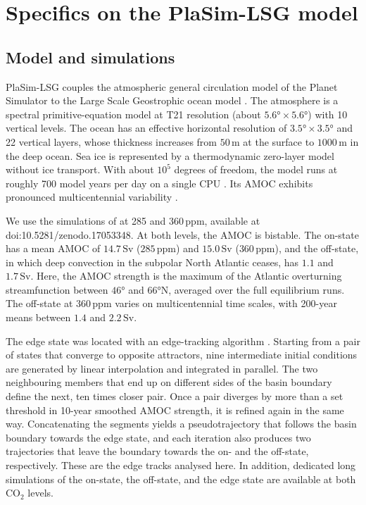 \documentclass[12pt, a4paper]{article}
\newcommand{\Sv}{\,\text{Sv}}    %
\newcommand{\CO}{CO\ensuremath{_2}}
\begin{document}
\section{Specifics on the PlaSim-LSG model}
\label{app:plasim}

\subsection*{Model and simulations}

PlaSim-LSG couples the atmospheric general circulation model of the Planet Simulator \citep{Fraedrich2005PlanetSimulatorUser} to the Large Scale Geostrophic ocean model \citep{Maier-Reimer1993MeanCirculationHamburg}. The atmosphere is a spectral primitive-equation model at T21 resolution (about $5.6°\times5.6°$) with 10 vertical levels. The ocean has an effective horizontal resolution of $3.5°\times3.5°$ and 22 vertical layers, whose thickness increases from $50\,\text{m}$ at the surface to $1000\,\text{m}$ in the deep ocean. Sea ice is represented by a thermodynamic zero-layer model without ice transport. With about $10^5$ degrees of freedom, the model runs at roughly 700 model years per day on a single CPU \citep{Borner2026GlobalStabilityAtlantic}. Its AMOC exhibits pronounced multicentennial variability \citep{Mehling2023AMOCBoxPrecip}.

We use the simulations of \citet{Borner2026GlobalStabilityAtlantic} at 285 and $360\,\text{ppm}$, available at doi:10.5281/zenodo.17053348. At both levels, the AMOC is bistable. The on-state has a mean AMOC of $14.7\Sv{}$ ($285\,\text{ppm}$) and $15.0\Sv{}$ ($360\,\text{ppm}$), and the off-state, in which deep convection in the subpolar North Atlantic ceases, has $1.1$ and $1.7\Sv{}$. Here, the AMOC strength is the maximum of the Atlantic overturning streamfunction between $46°$ and $66°\text{N}$, averaged over the full equilibrium runs. The off-state at $360\,\text{ppm}$ varies on multicentennial time scales, with 200-year means between $1.4$ and $2.2\Sv{}$.

The edge state was located with an edge-tracking algorithm \citep{Lucarini2017EdgeTracking}. Starting from a pair of states that converge to opposite attractors, nine intermediate initial conditions are generated by linear interpolation and integrated in parallel. The two neighbouring members that end up on different sides of the basin boundary define the next, ten times closer pair. Once a pair diverges by more than a set threshold in 10-year smoothed AMOC strength, it is refined again in the same way. Concatenating the segments yields a pseudotrajectory that follows the basin boundary towards the edge state, and each iteration also produces two trajectories that leave the boundary towards the on- and the off-state, respectively. These are the edge tracks analysed here. In addition, dedicated long simulations of the on-state, the off-state, and the edge state are available at both \CO{} levels.
\end{document}
